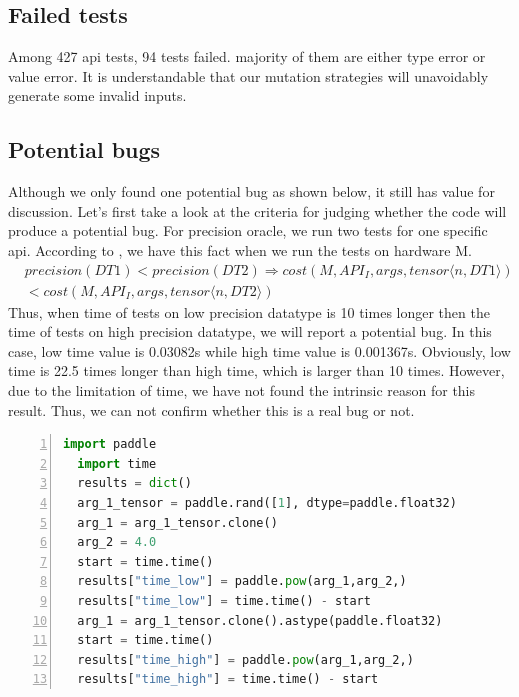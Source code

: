 \documentclass[sigconf]{acmart}
\begin{document}
  \subsection{Failed tests}
  Among 427 api tests, 94 tests failed. majority of them are either type error or value error. It is understandable that our mutation strategies will unavoidably generate some invalid inputs.
  \subsection{Potential bugs}
  Although we only found one potential bug as shown below, it still has value for discussion.
  Let's first take a look at the criteria for judging whether the code will produce a potential bug.
  For precision oracle, we run two tests for one specific api. According to \cite{w1}, we have this fact when 
  we run the tests on hardware M.
  \begin{equation}
    \begin{aligned}
      & precision(DT1) < precision(DT2) \Rightarrow cost(M, API_I, args, tensor \langle n, DT1 \rangle) \\
      & < cost(M, API_I, args, tensor \langle n, DT2 \rangle)
    \end{aligned}
  \end{equation}
  Thus, when time of tests on low precision datatype is 10 times longer then the time of tests on high precision datatype, we will report a potential bug. 
  In this case, low time value is 0.03082s while high time value is 0.001367s. Obviously, low time is 22.5 times longer than high time, which is larger than 10 times.
  However, due to the limitation of time, we have not found the intrinsic reason for this result. Thus, we can not confirm whether this is a real bug or not.
    
  
  \begin{lstlisting}[language=Python, numbers=left, caption={Potential bug when excuting precision oracle}, label={lst:potential_bug}]
  import paddle
  import time
  results = dict()
  arg_1_tensor = paddle.rand([1], dtype=paddle.float32)
  arg_1 = arg_1_tensor.clone()
  arg_2 = 4.0
  start = time.time()
  results["time_low"] = paddle.pow(arg_1,arg_2,)
  results["time_low"] = time.time() - start
  arg_1 = arg_1_tensor.clone().astype(paddle.float32)
  start = time.time()
  results["time_high"] = paddle.pow(arg_1,arg_2,)
  results["time_high"] = time.time() - start
\end{lstlisting}
\end{document}
